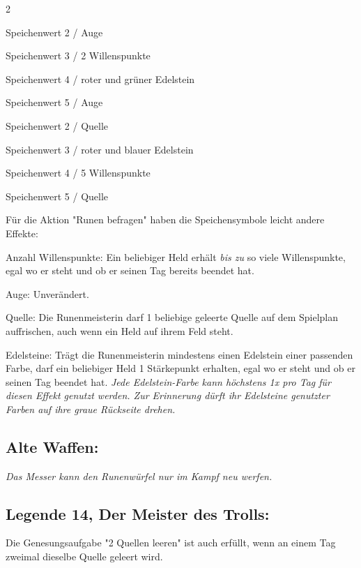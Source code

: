 \documentclass[10pt, a4paper, oneside]{book}
\newcommand{\fan}[1]{\textit{#1}}
\begin{document}
\begin{multicols*}{2}
\begin{bgcolor}
\bullet{} Speichenwert 2 / Auge

\bullet{} Speichenwert 3 / 2 Willenspunkte

\bullet{} Speichenwert 4 / roter und grüner Edelstein

\bullet{} Speichenwert 5 / Auge

\bullet{} Speichenwert 2 / Quelle

\bullet{} Speichenwert 3 / roter und blauer Edelstein

\bullet{} Speichenwert 4 / 5 Willenspunkte

\bullet{} Speichenwert 5 / Quelle

Für die Aktion "Runen befragen" haben die Speichensymbole leicht andere Effekte:

\bullet{} Anzahl Willenspunkte: Ein beliebiger\supercite{MH11:Heldenkarte_Runenmeisterin} Held erhält \fan{bis zu} so viele Willenspunkte, egal wo er steht und ob er seinen Tag bereits beendet hat.

\bullet{} Auge: Unverändert.

\bullet{} Quelle: Die Runenmeisterin darf 1 beliebige geleerte Quelle auf dem Spielplan auffrischen, auch wenn ein Held auf ihrem Feld steht.

\bullet{} Edelsteine: Trägt die Runenmeisterin mindestens einen Edelstein einer passenden Farbe, darf ein beliebiger\supercite{MH11:Heldenkarte_Runenmeisterin} Held 1 Stärkepunkt erhalten, egal wo er steht und ob er seinen Tag beendet hat. \fan{Jede Edelstein-Farbe kann höchstens 1x pro Tag für diesen Effekt genutzt werden. Zur Erinnerung dürft ihr Edelsteine genutzter Farben auf ihre graue Rückseite drehen.}
\supercite{98910}


\subsection{Alte Waffen:}

\fan{Das Messer kann den Runenwürfel nur im Kampf neu werfen.}


\subsection{Legende 14, Der Meister des Trolls:}

Die Genesungsaufgabe "2 Quellen leeren" ist auch erfüllt, wenn an einem Tag zweimal dieselbe Quelle geleert wird.
\supercite{94130}


\end{bgcolor}





\end{multicols*}
\end{document}
